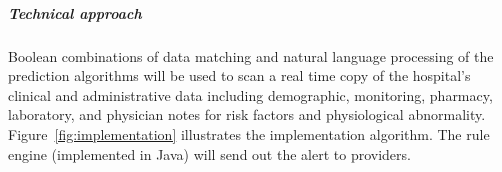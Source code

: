 \documentclass[11pt,notitlepage]{article}
\begin{document}
\subparagraph*{Technical approach}
Boolean combinations of data matching and natural language processing of the prediction algorithms will be used to scan a real time copy of the hospital's clinical and administrative data including demographic, monitoring, pharmacy, laboratory, and physician notes for risk factors and physiological abnormality. Figure~\ref{fig:implementation} illustrates the implementation algorithm. The rule engine (implemented in Java) will send out the alert to providers.


\newpage


\end{document}
